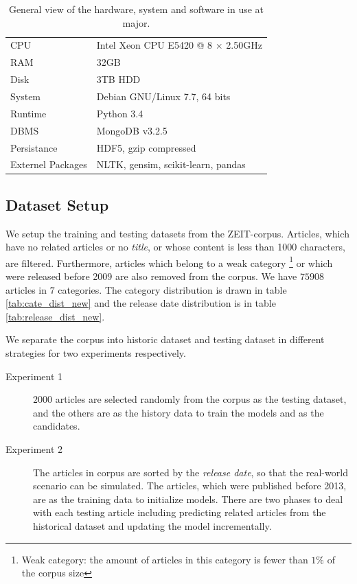 \begin{table}[!htb]
\begin{tabular}{ll}
CPU & Intel Xeon CPU E5420 @ 8 $\times$ 2.50GHz \\
RAM & 32GB \\ 
Disk & 3TB HDD \\ 
System & Debian GNU/Linux 7.7, 64 bits \\ 
Runtime & Python 3.4 \\
DBMS & MongoDB v3.2.5\\ 
Persistance & HDF5, gzip compressed \\
Externel Packages & NLTK, gensim, scikit-learn, pandas \\
\end{tabular}
\caption{General view of the hardware, system and software in use at major. }
\label{tab:pcinfo}
\end{table}


\subsection{Dataset Setup}
\label{sec:4.6}

We setup the training and testing datasets from the ZEIT-corpus. Articles, which have no related articles or no \textit{title}, or whose content is less than 1000 characters, are filtered. Furthermore, articles which belong to a weak category \footnote{Weak category: the amount of articles in this category is fewer than $1\%$ of the corpus size} or which were released before 2009 are also removed from the corpus. We have $75908$ articles in $7$ categories. The category distribution is drawn in table \ref{tab:cate_dist_new} and the release date distribution is in table \ref{tab:release_dist_new}. 

We separate the corpus into historic dataset and testing dataset in different strategies for two experiments respectively. 

\begin{description}
\item[Experiment 1] $2000$ articles are selected randomly from the corpus as the testing dataset, and the others are as the history data to train the models and as the candidates. 
\item[Experiment 2] The articles in corpus are sorted by the \textit{release date}, so that the real-world scenario can be simulated. The articles, which were published before 2013, are as the training data to initialize models. There are two phases to deal with each testing article including predicting related articles from the historical dataset and updating the model incrementally. 
\end{description}

